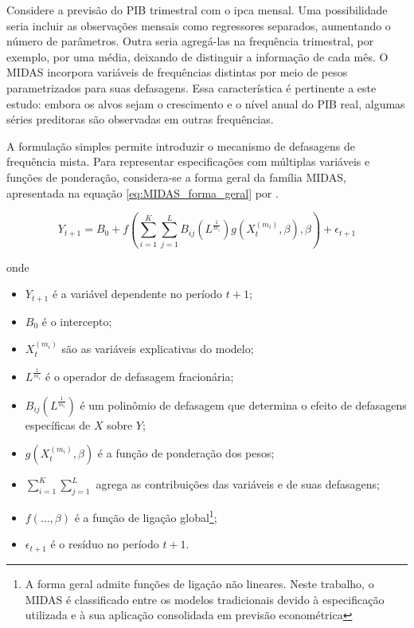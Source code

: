 Considere a previsão do PIB trimestral com o \ac{ipca} mensal. Uma possibilidade seria incluir as observações mensais como regressores separados, aumentando o número de parâmetros. Outra seria agregá-las na frequência trimestral, por exemplo, por uma média, deixando de distinguir a informação de cada mês. O MIDAS incorpora variáveis de frequências distintas por meio de pesos parametrizados para suas defasagens. Essa característica é pertinente a este estudo: embora os alvos sejam o crescimento e o nível anual do PIB real, algumas séries preditoras são observadas em outras frequências.

A formulação simples permite introduzir o mecanismo de defasagens de frequência mista. Para representar especificações com múltiplas variáveis e funções de ponderação, considera-se a forma geral da família MIDAS, apresentada na equação \ref{eq:MIDAS_forma_geral} por .

\begin{equation}
	\label{eq:MIDAS_forma_geral}
	Y_{t+1} = B_0 + f (\sum_{i=1}^{K}\sum_{j=1}^{L} B_{ij}(L^{\frac{1}{m_i}})      g (X_{t}^{(m_i)}, \beta), \beta )+  \epsilon_{t+1}
\end{equation}

onde
\begin{itemize}
	\item[a)] $Y_{t+1}$ é a variável dependente no período $t+1$;
	\item[b)] $B_0$ é o intercepto;
	\item[c)] $X_{t}^{(m_i)}$ são as variáveis explicativas do modelo;
	\item[d)] $L^{\frac{1}{m_i}}$ é o operador de defasagem fracionária;
	\item[e)] $B_{ij}(L^{\frac{1}{m_i}})$ é um polinômio de defasagem que determina o efeito de defasagens específicas de $X$ sobre $Y$;
	\item[f)] $g(X_{t}^{(m_i)}, \beta)$ é a função de ponderação dos pesos;
	\item[g)] $\sum_{i=1}^{K}\sum_{j=1}^{L}$ agrega as contribuições das variáveis e de suas defasagens;
	\item[h)] $f(\dots, \beta)$ é a função de ligação global\footnote{A forma geral admite funções de ligação não lineares. Neste trabalho, o MIDAS é classificado entre os modelos tradicionais devido à especificação utilizada e à sua aplicação consolidada em previsão econométrica};
	\item[i)] $\epsilon_{t+1}$ é o resíduo no período $t+1$.
\end{itemize}

